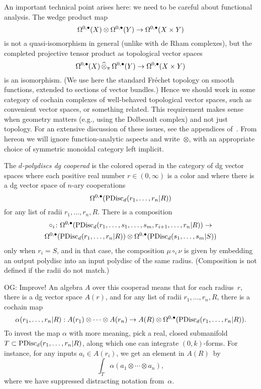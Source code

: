 \documentclass[11pt]{amsart}
\def\owen#1{{\textcolor{violet!50!black}{OG: {#1}}}}
\begin{document}
An important technical point arises here: 
we need to be careful about functional analysis.
The wedge product map
\[
\Omega^{0,\bullet}(X) \otimes \Omega^{0,\bullet}(Y) \to \Omega^{0,\bullet}(X \times Y)
\]
is not a quasi-isomorphism in general (unlike with de Rham complexes),
but the completed projective tensor product as topological vector spaces 
\[
\Omega^{0,\bullet}(X) \,\widehat{\otimes}_\pi\, \Omega^{0,\bullet}(Y) \to \Omega^{0,\bullet}(X \times Y)
\]
is an isomorphism.
(We use here the standard Fr\'echet topology on smooth functions, extended to sections of vector bundles.)
Hence we should work in some category of cochain complexes of well-behaved topological vector spaces, such as convenient vector spaces, or something related.
This requirement makes sense when geometry matters (e.g., using the Dolbeault complex) and not just topology.
For an extensive discussion of these issues, see the appendices of~\cite{CG1}.
From hereon we will ignore function-analytic aspects and write~$\otimes$,
with an appropriate choice of symmetric monoidal category left implicit.

\begin{dfn}
\label{dfn pdisc}
The {\em $d$-polydiscs dg cooperad} is the colored operad in the category of dg vector spaces where each positive real number $r \in (0,\infty)$ is a color 
and where there is a dg vector space of $n$-ary cooperations
\[
\Omega^{0,\bullet}({\rm PDisc}_d(r_1, \ldots, r_n| R)) 
\]
for any list of radii $r_1,\ldots, r_n, R$.
There is a composition
\begin{multline}
\circ_i \colon \Omega^{0,\bullet}({\rm PDisc}_d(r_1, \ldots, s_1, \ldots, s_m, r_{i+1}, \ldots, r_n| R)) \to \\ \Omega^{0,\bullet}({\rm PDisc}_d(r_1, \ldots, r_n| R)) \otimes \Omega^{0,\bullet}({\rm PDisc}_d(s_1, \ldots, s_m| S))
\end{multline}
only when $r_i = S$, 
and in that case, the composition $\mu \circ_i \nu$ is given by embedding an output polydisc into an input polydisc of the same radius.
(Composition is not defined if the radii do not match.)
\end{dfn}

\owen{Improve!}
An algebra $A$ over this cooperad means that for each radius~$r$, 
there is a dg vector space $A(r)$, and for any list of radii $r_1,\ldots, r_n, R$,
there is a cochain map
\[
\alpha(r_1, \ldots, r_n| R): A(r_1) \otimes \cdots \otimes A(r_n) \to A(R) \otimes \Omega^{0,\bullet}({\rm PDisc}_d(r_1, \ldots, r_n| R)) .
\]
To invest the map $\alpha$ with more meaning, 
pick a real, closed submanifold $T \subset {\rm PDisc}_d(r_1, \ldots, r_n| R)$, along which one can integrate $(0,k)$-forms.
For instance, for any inputs $a_i \in A(r_i)$, we get an element in $A(R)$~by
\[
\int_T \alpha(a_1 \otimes \cdots \otimes a_n),
\]
where we have suppressed distracting notation from~$\alpha$.
\end{document}
